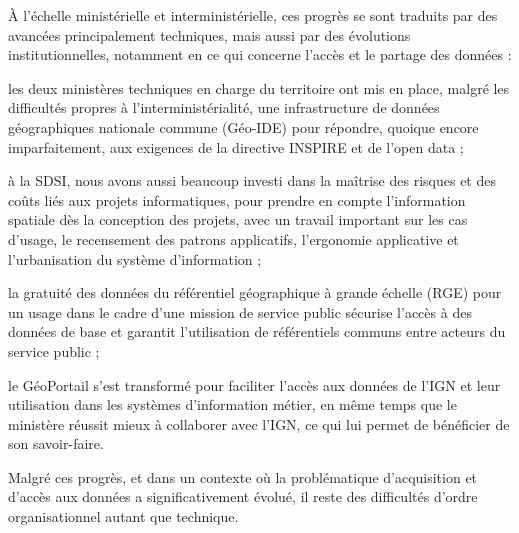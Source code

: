\stopitemize

À l'échelle ministérielle et interministérielle, ces progrès se sont traduits
par des avancées principalement techniques, mais aussi par des évolutions
institutionnelles, notamment en ce qui concerne l'accès et le partage des
données :

\startitemize

\item les deux ministères techniques en charge du territoire ont mis en place,
malgré les difficultés propres à l’interministérialité, une infrastructure de
données géographiques nationale commune (Géo-IDE) pour répondre, quoique
encore imparfaitement, aux exigences de la directive INSPIRE et de l'open data
;

\item à la SDSI, nous avons aussi beaucoup investi dans la maîtrise des risques et
des coûts liés aux projets informatiques, pour prendre en compte l'information
spatiale dès la conception des projets, avec un travail important sur les cas
d'usage, le recensement des patrons applicatifs, l'ergonomie applicative et
l'urbanisation du système d'information ;

\item la gratuité des données du référentiel géographique à grande échelle (RGE)
pour un usage dans le cadre d'une mission de service public sécurise l'accès à
des données de base et garantit l'utilisation de référentiels communs entre
acteurs du service public ;

\item le GéoPortail s'est transformé pour faciliter l'accès aux données de l'IGN et
leur utilisation dans les systèmes d'information métier, en même temps que le
ministère réussit mieux à collaborer avec l'IGN, ce qui lui permet de
bénéficier de son savoir-faire.

\stopitemize

Malgré ces progrès, et dans un contexte où la problématique d'acquisition et
d'accès aux données a significativement évolué, il reste des difficultés
d'ordre organisationnel autant que technique.





